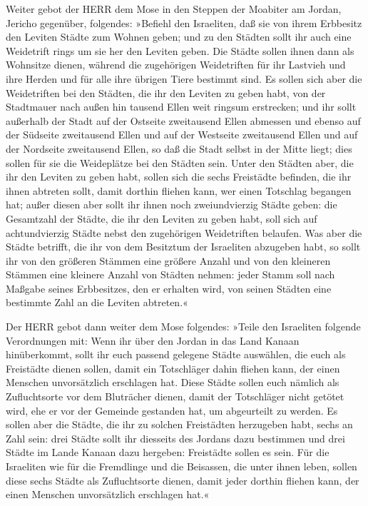 Weiter gebot der HERR dem Mose in den Steppen der Moabiter
am Jordan, Jericho gegenüber, folgendes: »Befiehl den
Israeliten, daß sie von ihrem Erbbesitz den Leviten Städte zum Wohnen
geben; und zu den Städten sollt ihr auch eine Weidetrift rings um sie
her den Leviten geben. Die Städte sollen ihnen dann als
Wohnsitze dienen, während die zugehörigen Weidetriften für ihr Lastvieh
und ihre Herden und für alle ihre übrigen Tiere bestimmt sind.
Es sollen sich aber die Weidetriften bei den Städten, die
ihr den Leviten zu geben habt, von der Stadtmauer nach außen hin tausend
Ellen weit ringsum erstrecken; und ihr sollt außerhalb der
Stadt auf der Ostseite zweitausend Ellen abmessen und ebenso auf der
Südseite zweitausend Ellen und auf der Westseite zweitausend Ellen und
auf der Nordseite zweitausend Ellen, so daß die Stadt selbst in der
Mitte liegt; dies sollen für sie die Weideplätze bei den Städten sein.
Unter den Städten aber, die ihr den Leviten zu geben habt,
sollen sich die sechs Freistädte befinden, die ihr ihnen abtreten sollt,
damit dorthin fliehen kann, wer einen Totschlag begangen hat; außer
diesen aber sollt ihr ihnen noch zweiundvierzig Städte geben:
die Gesamtzahl der Städte, die ihr den Leviten zu geben
habt, soll sich auf achtundvierzig Städte nebst den zugehörigen
Weidetriften belaufen. Was aber die Städte betrifft, die
ihr von dem Besitztum der Israeliten abzugeben habt, so sollt ihr von
den größeren Stämmen eine größere Anzahl und von den kleineren Stämmen
eine kleinere Anzahl von Städten nehmen: jeder Stamm soll nach Maßgabe
seines Erbbesitzes, den er erhalten wird, von seinen Städten eine
bestimmte Zahl an die Leviten abtreten.«

Der HERR gebot dann weiter dem Mose folgendes:
»Teile den Israeliten folgende Verordnungen mit: Wenn ihr
über den Jordan in das Land Kanaan hinüberkommt, sollt
ihr euch passend gelegene Städte auswählen, die euch als Freistädte
dienen sollen, damit ein Totschläger dahin fliehen kann, der einen
Menschen unvorsätzlich erschlagen hat. Diese Städte
sollen euch nämlich als Zufluchtsorte vor dem Bluträcher dienen, damit
der Totschläger nicht getötet wird, ehe er vor der Gemeinde gestanden
hat, um abgeurteilt zu werden. Es sollen aber die Städte,
die ihr zu solchen Freistädten herzugeben habt, sechs an Zahl sein:
drei Städte sollt ihr diesseits des Jordans dazu
bestimmen und drei Städte im Lande Kanaan dazu hergeben: Freistädte
sollen es sein. Für die Israeliten wie für die Fremdlinge
und die Beisassen, die unter ihnen leben, sollen diese sechs Städte als
Zufluchtsorte dienen, damit jeder dorthin fliehen kann, der einen
Menschen unvorsätzlich erschlagen hat.«

